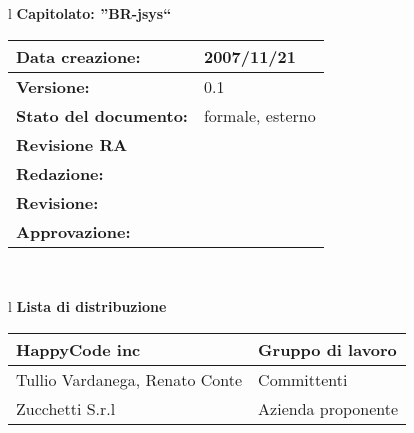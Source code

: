 

\newcommand{\lv}{ 0.1 } %
\newcommand{\dt}{ Piano Consuntivo }%
\newcommand{\Glossario}{ Glossario.1.8.pdf }


\begin{center}
\thispagestyle{plain}
\begin{table}[htbp]
\large{
\begin{tabular}{l}
\Large{\textbf{\textsf{Capitolato: ''BR-jsys``}}} \\
\begin{tabular}{|p{6cm}|p{6cm}|} \hline
\textbf{Data creazione:} & 2007/11/21 \\ \hline
\textbf{Versione:} & \lv \\ \hline
\textbf{Stato del documento:} & formale, esterno \\ \hline
\textbf{Revisione RA} &  \\ \hline
\textbf{Redazione:} & \ET \\ \hline
\textbf{Revisione:} & \MT \\ \hline
\textbf{Approvazione:} & \AT \\ \hline
\end{tabular} \\
\end{tabular}
}
\end{table}

\begin{table}[hbtp]
\large{
\begin{tabular}{l}
\Large{\textbf{\textsf{Lista di distribuzione}}} \\
\begin{tabular}{|p{6cm}|p{6cm}|} \hline
{HappyCode inc}& Gruppo di lavoro\\ \hline
{Tullio Vardanega, Renato Conte}& Committenti \\ \hline 
{Zucchetti S.r.l}& Azienda proponente\\ \hline
\end{tabular} \\
\end{tabular}
}
\end{table}
\begin{table}[hbtp]


\end{table}
\end{center}
